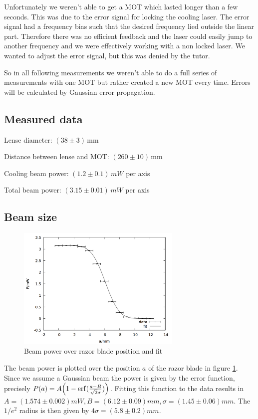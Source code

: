 Unfortunately we weren't able to get a MOT which lasted longer than a few seconds. This was due to the error signal for locking the cooling laser. The error signal had a frequency bias such that the desired frequency lied outside the linear part. Therefore there was no efficient feedback and the laser could easily jump to another frequency and we were effectively working with a non locked laser. We wanted to adjust the error signal, but this was denied by the tutor.

So in all following measurements we weren't able to do a full series of measurements with one MOT but rather created a new MOT every time. Errors will be calculated by Gaussian error propagation.

\subsection{Measured data}

Lense diameter: $\si{(38 \pm 3)\, \milli\meter}$

Distance between lense and MOT: $\si{(260 \pm 10)\,\milli\meter}$

Cooling beam power: $\si{(1.2 \pm 0.1)\,mW}$ per axis

Total beam power: $\si{(3.15 \pm 0.01)\,mW}$ per axis

\subsection{Beam size}

\begin{figure}
\centering
\includegraphics[width=0.7\textwidth]{data/beam.png}
\caption{Beam power over razor blade position and fit}
\label{fig:beam}
\end{figure}

The beam power is plotted over the position $a$ of the razor blade in figure \ref{fig:beam}. Since we assume a Gaussian beam the power is given by the error function, precisely $P(a) = A\qty(1-\erf(\frac{a-B}{\sqrt{2}\sigma}))$. Fitting this function to the data results in $A = \si{(1.574 \pm 0.002) mW}, B = \si{(6.12 \pm 0.09) mm}, \sigma = \si{(1.45 \pm 0.06) mm}$. The $1/e^2$ radius is then given by $4 \sigma = \si{(5.8 \pm 0.2) mm}$.

